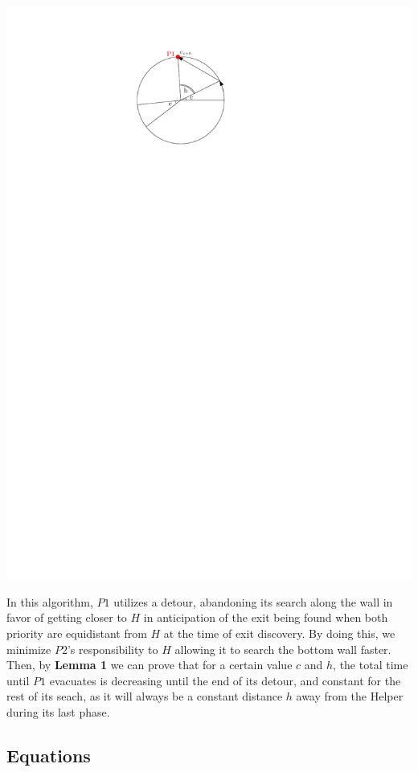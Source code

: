 \documentclass[11pt]{article}
\begin{document}
\begin{center}
\includegraphics{Q2S1_Eq/Q2S1_DetourExample.pdf}
\end{center}
\begin{flushleft}
    In this algorithm, $P1$ utilizes a detour, abandoning its search along the wall
    in favor of getting closer to $H$ in anticipation of the exit being found when both
    priority are equidistant from $H$ at the time of exit discovery. By doing this, we minimize
    $P2$'s responsibility to $H$ allowing it to search the bottom wall faster. Then, by
    \textbf{Lemma 1} we can prove that for a certain value $c$ and $h$, the total time until $P1$
    evacuates is decreasing until the end of its detour, and constant for the rest of its seach, as
    it will always be a constant distance $h$ away from the Helper during its last phase.
\end{flushleft}

\subsection{Equations}
\end{document}
